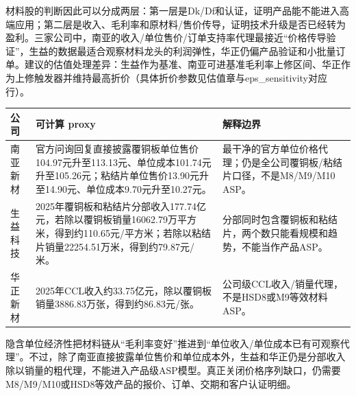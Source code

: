 材料股的判断因此可以分成两层：第一层是Dk/Df和认证，证明产品能不能进入高端应用；第二层是收入、毛利率和原材料/售价传导，证明技术升级是否已经转为盈利。三家公司中，南亚的收入/单位售价/订单支持率代理最接近“价格传导验证”，生益的数据最适合观察材料龙头的利润弹性，华正仍偏产品验证和小批量订单。建议的估值处理差异：生益作为基准、南亚可进基准毛利率上修区间、华正作为上修触发器并维持最高折价（具体折价参数见估值章与eps\_sensitivity对应行）。

\begin{exhibitbox}
\scriptsize
\begin{tabularx}{\textwidth}{L{1.8cm}X X}
\toprule
\textbf{公司} & \textbf{可计算 proxy} & \textbf{解释边界} \\
\midrule
南亚新材 & 官方问询回复直接披露覆铜板单位售价104.97元升至113.13元、单位成本101.74元升至105.26元；粘结片单位售价13.90元升至14.90元、单位成本9.70元升至10.27元。 & 最干净的官方单位价格代理；仍是全公司覆铜板/粘结片口径，不是M8/M9/M10 ASP。 \\
生益科技 & 2025年覆铜板和粘结片分部收入177.74亿元，若除以覆铜板销量16062.79万平方米，得到约110.65元/平方米；若除以粘结片销量22254.51万米，得到约79.87元/米。 & 分部同时包含覆铜板和粘结片，两个数只能看规模和趋势，不能当作产品ASP。 \\
华正新材 & 2025年CCL收入约33.75亿元，除以覆铜板销量3886.83万张，得到约86.83元/张。 & 公司级CCL收入/销量代理，不是HSD8或M9等效材料ASP。 \\
\bottomrule
\end{tabularx}
\end{exhibitbox}

隐含单位经济性把材料链从“毛利率变好”推进到“单位收入/单位成本已有可观察代理”。不过，除了南亚直接披露单位售价和单位成本外，生益和华正仍是分部收入除以销量的粗代理，不能进入产品级ASP模型。真正关闭价格序列缺口，仍需要M8/M9/M10或HSD8等效产品的报价、订单、交期和客户认证明细。

